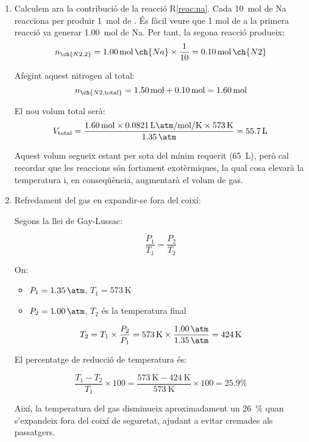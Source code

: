 {\begin{enumerate}
    \item Calculem ara la contribució de la reacció R\ref{reac:na}.
    Cada \qty{10}{\mol} de Na reacciona per produir \qty{1}{\mol} de . És fàcil veure que 1 mol de  a la primera reacció va generar \qty{1.00}{\mol} de Na. Per tant, la segona reacció produeix:  
    \begin{equation}
        n_{\ch{N2,2}} = \qty{1.00}{\mol} \, \ch{Na} \times \frac{1}{10} = \qty{0.10}{\mol}\, \ch{N2}
    \end{equation}
    
    Afegint aquest nitrogen al total:  
    \begin{equation}
        n_{\ch{N2,\text{total}}} = \qty{1.50}{\mol} + \qty{0.10}{\mol} = \qty{1.60}{\mol}
    \end{equation}
    
    El nou volum total serà:  
    \begin{equation}
        V_{\text{total}} = \frac{\qty{1.60}{\mol} \times \qty{0.0821}{\liter\atm\per\mol\per\kelvin} \times \qty{573}{\kelvin}}{\qty{1.35}{\atm}} = \qty{55.7}{\liter}
    \end{equation}
    
    Aquest volum segueix estant per sota del mínim requerit (\qty{65}{\liter}), però cal recordar que les reaccions són fortament exotèrmiques, la qual cosa elevarà la temperatura i, en conseqüència, augmentarà el volum de gas.
    
    \item Refredament del gas en expandir-se fora del coixí:
    
    Segons la llei de Gay-Lussac:
    
    \begin{equation}
        \frac{P_1}{T_1} = \frac{P_2}{T_2}
    \end{equation}
    
    On:
    \begin{itemize}
        \item $P_1 = \qty{1.35}{\atm}$, $T_1 = \qty{573}{\kelvin}$
        \item $P_2 = \qty{1.00}{\atm}$, $T_2$ és la temperatura final
    \end{itemize}
    
    \begin{equation}
        T_2 = T_1 \times \frac{P_2}{P_1}
 = \qty{573}{\kelvin} \times \frac{\qty{1.00}{\atm}}{\qty{1.35}{\atm}}
= \qty{424}{\kelvin}
    \end{equation}
    
    El percentatge de reducció de temperatura és:
    
    \begin{equation}
        \frac{T_1 - T_2}{T_1} \times 100 = \frac{\qty{573}{\kelvin} - \qty{424}{\kelvin}}{\qty{573}{\kelvin}} \times 100 = 25.9\%
    \end{equation}
    
    Així, la temperatura del gas disminueix aproximadament un \qty{26}{\percent} quan s'expandeix fora del coixí de seguretat, ajudant a evitar cremades als passatgers.
\end{enumerate}
}
